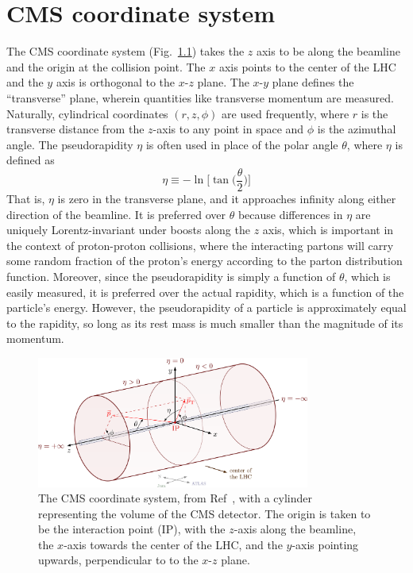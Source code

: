 \chapter{CMS coordinate system}\label{apdx:cms_coords}
The CMS coordinate system (Fig.~\ref{fig:cms_coords}) takes the $z$ axis to be along the beamline and the origin at the collision point. 
The $x$ axis points to the center of the LHC and the $y$ axis is orthogonal to the $x$-$z$ plane. 
The $x$-$y$ plane defines the ``transverse'' plane, wherein quantities like transverse momentum \pt are measured. 
Naturally, cylindrical coordinates $(r,z,\phi)$ are used frequently, where $r$ is the transverse distance from the $z$-axis to any point in space and $\phi$ is the azimuthal angle. 
The pseudorapidity $\eta$ is often used in place of the polar angle $\theta$, where $\eta$ is defined as
\begin{equation}
    \eta \equiv -\ln{\bigg[\tan\bigg(\frac{\theta}{2}\bigg)\bigg]}
\end{equation}
That is, $\eta$ is zero in the transverse plane, and it approaches infinity along either direction of the beamline. 
It is preferred over $\theta$ because differences in $\eta$ are uniquely Lorentz-invariant under boosts along the $z$ axis, which is important in the context of proton-proton collisions, where the interacting partons will carry some random fraction of the proton's energy according to the parton distribution function. 
Moreover, since the pseudorapidity is simply a function of $\theta$, which is easily measured, it is preferred over the actual rapidity, which is a function of the particle's energy. 
However, the pseudorapidity of a particle is approximately equal to the rapidity, so long as its rest mass is much smaller than the magnitude of its momentum. 

\begin{figure}[htb]
    \centering
    \includegraphics[width=0.8\textwidth]{fig/cms/coord_system.png}
    \caption[The CMS coordinate system.]{
        The CMS coordinate system, from Ref~\cite{CMSCoords}, with a cylinder representing the volume of the CMS detector. 
        The origin is taken to be the interaction point (IP), with the $z$-axis along the beamline, the $x$-axis towards the center of the LHC, and the $y$-axis pointing upwards, perpendicular to to the $x$-$z$ plane.
    }
    \label{fig:cms_coords}
\end{figure}

